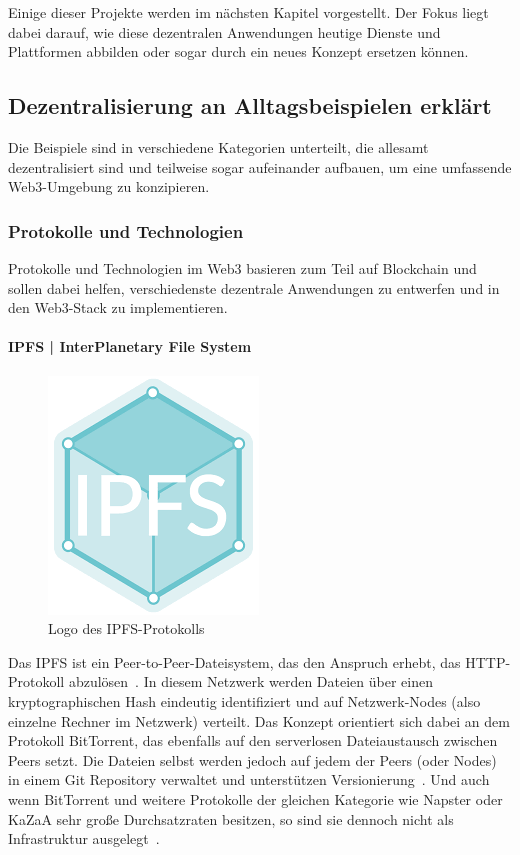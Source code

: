 Einige dieser Projekte werden im nächsten Kapitel vorgestellt. Der Fokus liegt dabei darauf, wie diese dezentralen Anwendungen heutige Dienste und Plattformen abbilden oder sogar durch ein neues Konzept ersetzen können. 


\subsection{Dezentralisierung an Alltagsbeispielen erklärt}

Die Beispiele sind in verschiedene Kategorien unterteilt, die allesamt dezentralisiert sind und teilweise sogar aufeinander aufbauen, um eine umfassende Web3-Umgebung zu konzipieren.


\subsubsection{Protokolle und Technologien}

Protokolle und Technologien im Web3 basieren zum Teil auf Blockchain und sollen dabei helfen, verschiedenste dezentrale Anwendungen zu entwerfen und in den Web3-Stack zu implementieren. 


\paragraph{IPFS | InterPlanetary File System}

\begin{figure}
	\centering
	\includegraphics[scale=0.5]{images/ipfs_logo}
	\caption{Logo des IPFS-Protokolls~\cite{ProtocolLabs.2019}}
	\label{fig:ipfs}
\end{figure}

Das IPFS ist ein Peer-to-Peer-Dateisystem, das den Anspruch erhebt, das HTTP-Protokoll abzulösen~\cite{IdeasEngineering.2018}. In diesem Netzwerk werden Dateien über einen kryptographischen Hash eindeutig identifiziert und auf Netzwerk-Nodes (also einzelne Rechner im Netzwerk) verteilt. Das Konzept orientiert sich dabei an dem Protokoll BitTorrent, das ebenfalls auf den serverlosen Dateiaustausch zwischen Peers setzt. Die Dateien selbst werden jedoch auf jedem der Peers (oder Nodes) in einem Git Repository verwaltet und unterstützen Versionierung~\cite{IdeasEngineering.2018}. Und auch wenn BitTorrent und weitere Protokolle der gleichen Kategorie wie Napster oder KaZaA sehr große Durchsatzraten besitzen, so sind sie dennoch nicht als Infrastruktur ausgelegt~\cite{Benet.2014}.

